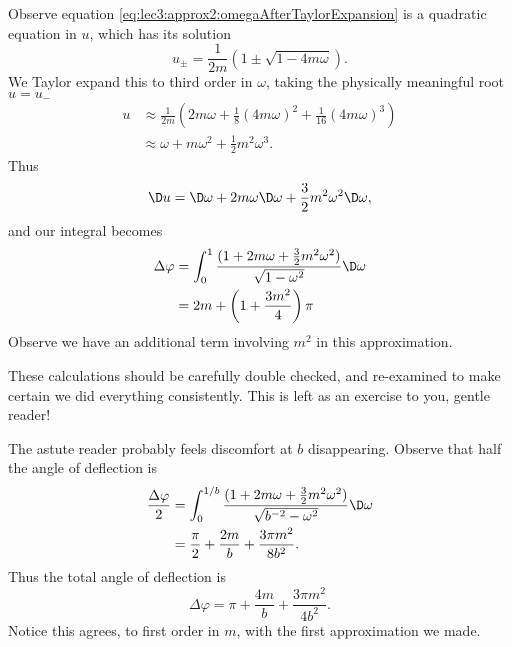 Observe equation
\eqref{eq:lec3:approx2:omegaAfterTaylorExpansion} is a quadratic equation in $u$, which has its
solution
\begin{equation}
u_{\pm}=\frac{1}{2m}(1\pm\sqrt{1-4m\omega}).
\end{equation}
We Taylor expand this to third order in $\omega$, taking the
physically meaningful root $u=u_{-}$
\begin{equation}
\begin{split}
u&\approx\frac{1}{2m}\left(2m\omega+\frac{1}{8}(4m\omega)^{2}+\frac{1}{16}(4m\omega)^{3}
\right)\\
&\approx \omega+m\omega^{2}+\frac{1}{2}m^{2}\omega^{3}.
\end{split}
\end{equation}
Thus
\begin{equation}
\D u=\D\omega+2m\omega\D\omega+\frac{3}{2}m^{2}\omega^{2}\D\omega,
\end{equation}
and our integral becomes
\begin{equation}
\begin{split}
\Delta\varphi
&=\int^{1}_{0}\frac{(1+2m\omega+\frac{3}{2}m^{2}\omega^{2})}{\sqrt{1-\omega^{2}}}\D\omega\\
&=2m+\left(1+\frac{3m^{2}}{4}\right)\pi
\end{split}
\end{equation}
Observe we have an additional term involving $m^{2}$ in this approximation.
\begin{ddanger}
These calculations should be carefully double checked, and
re-examined to make certain we did everything consistently. This
is left as an exercise to you, gentle reader!
\end{ddanger}
The astute reader probably feels discomfort at $b$
disappearing. Observe that half the angle of deflection is
\begin{equation}
\begin{split}
\frac{\Delta\varphi}{2} &=
\int^{1/b}_{0}\frac{(1+2m\omega+\frac{3}{2}m^{2}\omega^{2})}{\sqrt{b^{-2}-\omega^{2}}}\D\omega\\
&=\frac{\pi}{2}+\frac{2m}{b}+\frac{3\pi m^{2}}{8b^{2}}.
\end{split}
\end{equation}
Thus the total angle of deflection is
\begin{equation}
\Delta\varphi=\pi+\frac{4m}{b}+\frac{3\pi m^{2}}{4b^{2}}.
\end{equation}
Notice this agrees, to first order in $m$, with the first
approximation we made.

